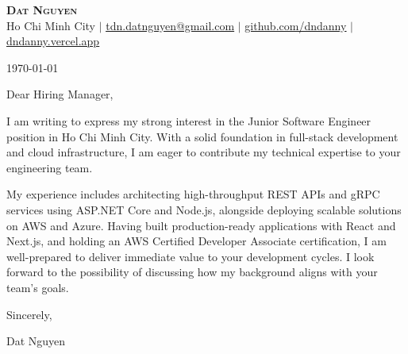 \documentclass[letterpaper,11pt]{article}
\begin{document}
\begin{center}
\textbf{\Huge \scshape Dat Nguyen} \\ \vspace{1pt}
\small Ho Chi Minh City $|$ \href{mailto:tdn.datnguyen@gmail.com}{\underline{tdn.datnguyen@gmail.com}} $|$ \href{https://github.com/dndanny}{\underline{github.com/dndanny}} $|$ \href{https://dndanny.vercel.app}{\underline{dndanny.vercel.app}}
\end{center}

\vspace{20pt}

\today

\vspace{20pt}

Dear Hiring Manager,

I am writing to express my strong interest in the Junior Software Engineer position in Ho Chi Minh City. With a solid foundation in full-stack development and cloud infrastructure, I am eager to contribute my technical expertise to your engineering team.

My experience includes architecting high-throughput REST APIs and gRPC services using ASP.NET Core and Node.js, alongside deploying scalable solutions on AWS and Azure. Having built production-ready applications with React and Next.js, and holding an AWS Certified Developer Associate certification, I am well-prepared to deliver immediate value to your development cycles. I look forward to the possibility of discussing how my background aligns with your team's goals.

Sincerely,

\vspace{40pt}

Dat Nguyen
\end{document}
